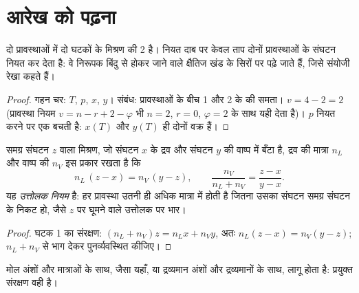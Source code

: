 \section{आरेख को पढ़ना}

\begin{proposition}[द्वि-प्रावस्थी द्वि-घटकी निकाय की स्वातंत्र्य कोटि]\label{prop:b2:liquid-vapour-diagrams:variance}
दो प्रावस्थाओं में दो घटकों के मिश्रण की  2 है। नियत दाब पर
केवल ताप दोनों प्रावस्थाओं के संघटन नियत कर देता है: वे निरूपक बिंदु से होकर
जाने वाले क्षैतिज खंड के सिरों पर पढ़े जाते हैं,
जिसे संयोजी रेखा कहते हैं।
\end{proposition}

\begin{proof}
गहन चर: $T$, $p$, $x$, $y$। संबंध: प्रावस्थाओं के बीच 1 और 2 के  की समता। $v = 4 - 2 = 2$ (प्रावस्था नियम
$v = n - r + 2 - \varphi$ भी $n = 2$, $r = 0$, $\varphi = 2$ के साथ यही देता है)।
$p$ नियत करने पर एक  बचती है: $x(T)$ और $y(T)$ ही दोनों वक्र हैं।
\end{proof}

\begin{theorem}[उत्तोलक नियम]\label{thm:b2:liquid-vapour-diagrams:lever}
समग्र संघटन $z$ वाला मिश्रण, जो संघटन $x$ के द्रव
और संघटन $y$ की वाष्प में बँटा है, द्रव की मात्रा $n_L$ और वाष्प की $n_V$
इस प्रकार रखता है कि
\[
  n_L\,(z - x) = n_V\,(y - z), \qquad \frac{n_V}{n_L + n_V} = \frac{z - x}{y - x} .
\]
यह \emph{उत्तोलक नियम} है: हर प्रावस्था उतनी ही
अधिक मात्रा में होती है जितना उसका संघटन समग्र संघटन के निकट हो, जैसे
$z$ पर घूमने वाले उत्तोलक पर भार।
\end{theorem}

\begin{proof}
घटक 1 का संरक्षण: $(n_L + n_V)z = n_Lx + n_Vy$, अतः $n_L(z - x) =
n_V(y - z)$; $n_L + n_V$ से भाग देकर पुनर्व्यवस्थित कीजिए।
\end{proof}

 मोल अंशों और मात्राओं के साथ, जैसा यहाँ, या द्रव्यमान
अंशों और द्रव्यमानों के साथ, लागू होता है: प्रयुक्त संरक्षण वही है।

